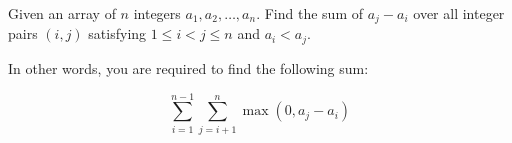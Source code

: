 Given an array of $n$ integers $a_1,a_2,\ldots,a_n$.
Find the sum of $a_j - a_i$ over all integer pairs $(i, j)$ satisfying $1 \leq i < j \leq n$ and $a_i < a_j$.

In other words, you are required to find the following sum:

\[\sum_{i=1}^{n-1} \sum_{j= i+1}^{n} \max(0, a_j - a_i)\]